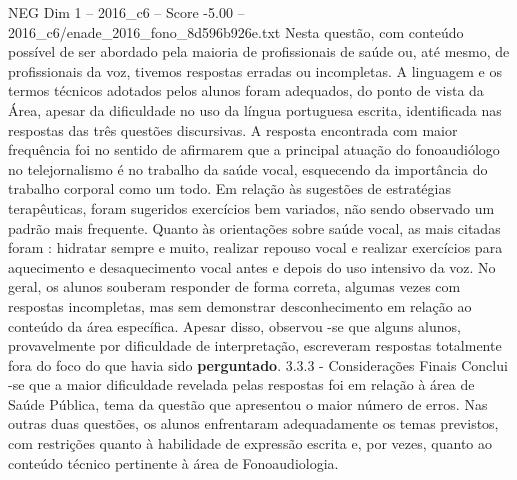 \begin{textsample}{NEG Dim 1 – 2016\_c6 – Score -5.00 – 2016\_c6/enade\_2016\_fono\_8d596b926e.txt}
Nesta questão, com conteúdo possível de ser abordado pela maioria de profissionais de saúde ou, até mesmo, de profissionais da voz, tivemos respostas erradas ou incompletas.
A linguagem e os termos técnicos adotados pelos alunos foram adequados, do ponto de vista da Área, apesar da dificuldade no uso da língua portuguesa escrita, identificada nas respostas das três questões discursivas.
A resposta encontrada com maior frequência foi no sentido de afirmarem que a principal atuação do fonoaudiólogo no telejornalismo é no trabalho da saúde vocal, esquecendo da importância do trabalho corporal como um todo.
Em relação às sugestões de estratégias terapêuticas, foram sugeridos exercícios bem variados, não sendo observado um padrão mais frequente.
Quanto às orientações sobre saúde vocal, as mais citadas foram : hidratar sempre e muito, realizar repouso vocal e realizar exercícios para aquecimento e desaquecimento vocal antes e depois do uso intensivo da voz.
No geral, os alunos souberam responder de forma correta, algumas vezes com respostas incompletas, mas sem demonstrar desconhecimento em relação ao conteúdo da área específica.
Apesar disso, observou -se que alguns alunos, provavelmente por dificuldade de interpretação, escreveram respostas totalmente fora do foco do que havia sido \textbf{perguntado}. 3.3.3 - Considerações Finais Conclui -se que a maior dificuldade revelada pelas respostas foi em relação à área de Saúde Pública, tema da questão que apresentou o maior número de erros.
Nas outras duas questões, os alunos enfrentaram adequadamente os temas previstos, com restrições quanto à habilidade de expressão escrita e, por vezes, quanto ao conteúdo técnico pertinente à área de Fonoaudiologia.

\end{textsample}
